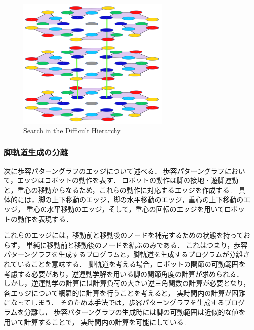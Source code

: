 \begin{figure}[htbp]
  \begin{center}
    \includegraphics[width=75mm, clip]{figure/chapter2/hierarchy.png}
    \caption{Search in the Difficult Hierarchy}
    \label{fig:hierarchy} %
  \end{center}
\end{figure}

\subsubsection{脚軌道生成の分離}
次に歩容パターングラフのエッジについて述べる．
歩容パターングラフにおいて，エッジはロボットの動作を表す．
ロボットの動作は脚の接地・遊脚運動と，重心の移動からなるため，これらの動作に対応するエッジを作成する．
具体的には，脚の上下移動のエッジ，脚の水平移動のエッジ，重心の上下移動のエッジ，
重心の水平移動のエッジ，そして，重心の回転のエッジを用いてロボットの動作を表現する．

これらのエッジには，移動前と移動後のノードを補完するための状態を持っておらず，
単純に移動前と移動後のノードを結ぶのみである．
これはつまり，歩容パターングラフを生成するプログラムと，脚軌道を生成するプログラムが分離されていることを意味する．
脚軌道を考える場合，ロボットの関節の可動範囲を考慮する必要があり，逆運動学解を用いる脚の関節角度の計算が求められる．
しかし，逆運動学の計算には計算負荷の大きい逆三角関数の計算が必要となり，各エッジについて網羅的に計算を行うことを考えると，
実時間内の計算が困難になってしまう．
そのため本手法では，歩容パターングラフを生成するプログラムを分離し，
歩容パターングラフの生成時には脚の可動範囲は近似的な値を用いて計算することで，
実時間内の計算を可能にしている．

